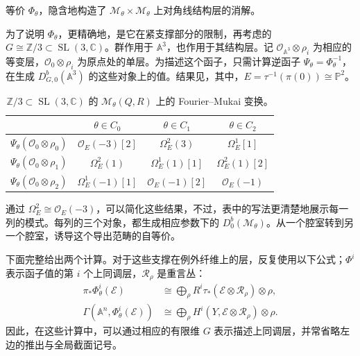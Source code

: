 \begin{note}[94]\label{note:4.94}
等价 $\Phi_\theta$，隐含地构造了 $\mathcal{M}_\theta\times\mathcal{M}_\theta$ 上对角线结构层的消解。
\end{note}

\begin{example}\label{ex:4.95}
为了说明 $\Phi_\theta$，更精确地，是它在紧支撑部分的限制，再考虑的 $G\cong\mathbb{Z}/3\subset\operatorname{SL}(3,\mathbb{C})$。群作用于 $\mathbb{A}^3$，也作用于其结构层。记 $\mathcal{O}_{\mathbb{A}^3}\otimes\rho_i$ 为相应的等变层，$\mathcal{O}_0\otimes\rho_i$ 为原点处的单层。为描述这个函子，只需计算逆函子 $\Psi_\theta=\Phi_\theta^{-1}$，在生成 $D_{G,0}^b(\mathbb{A}^3)$ 的这些对象上的值。结果见，其中，$E=\tau^{-1}(\pi(0))\cong\mathbb{P}^2$。
\begin{table}[H]
\centering
\caption{$\mathbb{Z}/3\subset\operatorname{SL}(3,\mathbb{C})$ 的 $\mathcal{M}_\theta(Q,R)$ 上的 Fourier--Mukai 变换。}\label{tab:4.3}
\begin{tabular}{lccc}
\toprule
 & $\theta\in C_0$ & $\theta\in C_1$ & $\theta\in C_2$\\
\midrule
$\Psi_\theta(\mathcal{O}_0\otimes\rho_0)$ & $\mathcal{O}_E(-3)[2]$ & $\Omega_E^2(3)$ & $\Omega_E^1[1]$\\
$\Psi_\theta(\mathcal{O}_0\otimes\rho_1)$ & $\Omega_E^2(1)$ & $\Omega_E^1(1)[1]$ & $\Omega_E^2(1)[2]$\\
$\Psi_\theta(\mathcal{O}_0\otimes\rho_2)$ & $\Omega_E^1(-1)[1]$ & $\mathcal{O}_E(-1)[2]$ & $\mathcal{O}_E(-1)$\\
\bottomrule
\end{tabular}
\end{table}
通过 $\Omega_E^2\cong\mathcal{O}_E(-3)$，可以简化这些结果，不过，表中的写法更清楚地展示每一列的模式。每列的三个对象，都生成相应参数下的 $D_0^b(\mathcal{M}_\theta)$。从一个腔室转到另一个腔室，诱导这个导出范畴的自等价。

下面完整给出两个计算。对于这些支撑在例外纤维上的层，反复使用以下公式；$\Phi^i$ 表示函子值的第 $i$ 个上同调层，$\mathcal{R}_\rho$ 是重言丛：
\begin{equation}\label{eq:4.15}
\begin{aligned}
\pi_*\Phi_\theta^i(\mathcal{E})
&\cong\bigoplus_\rho
R^i\tau_*(\mathcal{E}\otimes\mathcal{R}_\rho)\otimes\rho,\\
\Gamma(\mathbb{A}^n,\Phi_\theta^i(\mathcal{E}))
&\cong\bigoplus_\rho
H^i(Y,\mathcal{E}\otimes\mathcal{R}_\rho)\otimes\rho.
\end{aligned}
\end{equation}
因此，在这些计算中，可以通过相应的有限维 $G$ 表示描述上同调层，并常省略左边的推出与全局截面记号。


\end{example}
